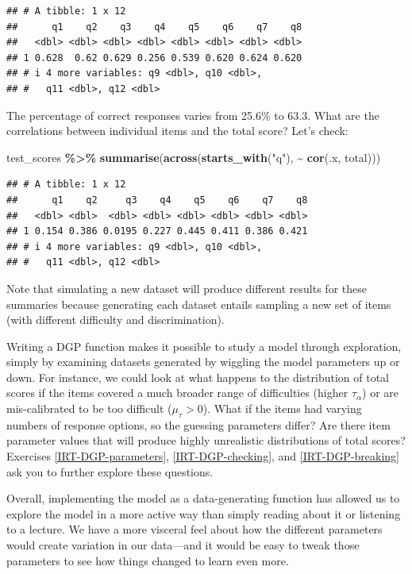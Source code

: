 \documentclass[
]{book}
\newenvironment{Shaded}{\begin{snugshade}}{\end{snugshade}}
\newcommand{\FunctionTok}[1]{\textcolor[rgb]{0.13,0.29,0.53}{\textbf{#1}}}
\newcommand{\NormalTok}[1]{#1}
\newcommand{\SpecialCharTok}[1]{\textcolor[rgb]{0.81,0.36,0.00}{\textbf{#1}}}
\newcommand{\StringTok}[1]{\textcolor[rgb]{0.31,0.60,0.02}{#1}}
\begin{document}
\begin{verbatim}
## # A tibble: 1 x 12
##      q1    q2    q3    q4    q5    q6    q7    q8
##   <dbl> <dbl> <dbl> <dbl> <dbl> <dbl> <dbl> <dbl>
## 1 0.628  0.62 0.629 0.256 0.539 0.620 0.624 0.620
## # i 4 more variables: q9 <dbl>, q10 <dbl>,
## #   q11 <dbl>, q12 <dbl>
\end{verbatim}

The percentage of correct responses varies from 25.6\% to 63.3.
What are the correlations between individual items and the total score?
Let's check:

\begin{Shaded}
\begin{Highlighting}[]
\NormalTok{test\_scores }\SpecialCharTok{\%\textgreater{}\%}
  \FunctionTok{summarise}\NormalTok{(}\FunctionTok{across}\NormalTok{(}\FunctionTok{starts\_with}\NormalTok{(}\StringTok{"q"}\NormalTok{), }\SpecialCharTok{\textasciitilde{}} \FunctionTok{cor}\NormalTok{(.x, total)))}
\end{Highlighting}
\end{Shaded}

\begin{verbatim}
## # A tibble: 1 x 12
##      q1    q2     q3    q4    q5    q6    q7    q8
##   <dbl> <dbl>  <dbl> <dbl> <dbl> <dbl> <dbl> <dbl>
## 1 0.154 0.386 0.0195 0.227 0.445 0.411 0.386 0.421
## # i 4 more variables: q9 <dbl>, q10 <dbl>,
## #   q11 <dbl>, q12 <dbl>
\end{verbatim}

Note that simulating a new dataset will produce different results for these summaries because generating each dataset entails sampling a new set of items (with different difficulty and discrimination).

Writing a DGP function makes it possible to study a model through exploration, simply by examining datasets generated by wiggling the model parameters up or down.
For instance, we could look at what happens to the distribution of total scores if the items covered a much broader range of difficulties (higher \(\tau_\alpha\)) or are mis-calibrated to be too difficult (\(\mu_\tau > 0\)).
What if the items had varying numbers of response options, so the guessing parameters differ?
Are there item parameter values that will produce highly unrealistic distributions of total scores?
Exercises \ref{IRT-DGP-parameters}, \ref{IRT-DGP-checking}, and \ref{IRT-DGP-breaking} ask you to further explore these questions.

Overall, implementing the model as a data-generating function has allowed us to explore the model in a more active way than simply reading about it or listening to a lecture.
We have a more visceral feel about how the different parameters would create variation in our data---and it would be easy to tweak those parameters to see how things changed to learn even more.
\end{document}
